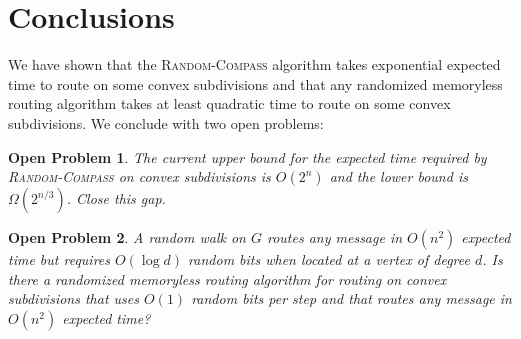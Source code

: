 \documentclass [letterpaper] {patmorin}
\newtheorem{op}{Open Problem}
\begin{document}
\section{Conclusions}

We have shown that the \textsc{Random-Compass} algorithm takes exponential
expected time to route on some convex subdivisions and that any randomized
memoryless routing algorithm takes at least quadratic time to route on some
convex subdivisions.  We conclude with two open problems:

\begin{op}
The current upper bound for the expected time required by \textsc{Random-Compass} on convex subdivisions is $O(2^n)$ and the lower bound is $\Omega(2^{n/3})$.  Close this gap.
\end{op}

\begin{op}
A random walk on $G$ routes any message in $O(n^2)$ expected time but requires $O(\log d)$ random bits when located at a vertex of degree $d$.  Is there a randomized memoryless routing algorithm for routing on convex subdivisions that uses $O(1)$ random bits per step and that routes any message in $O(n^2)$ expected time?
\end{op}








\end{document}
